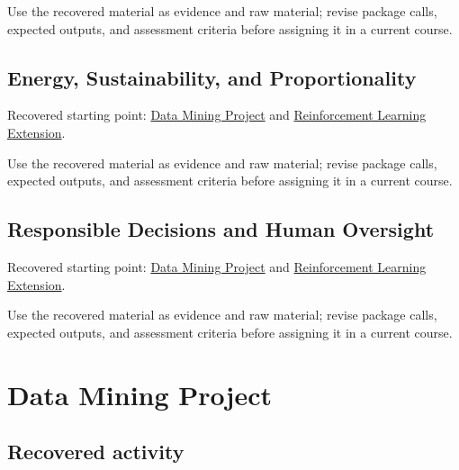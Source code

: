 \documentclass[
  letterpaper,
]{scrbook}
\begin{document}
Use the recovered material as evidence and raw material; revise package
calls, expected outputs, and assessment criteria before assigning it in
a current course.

\section*{Energy, Sustainability, and
Proportionality}\label{sec-pr-16-energy-sustainability-and-proportionality}


Recovered starting point: \hyperref[sec-lab-data-mining-project]{Data
Mining Project} and
\hyperref[sec-lab-reinforcement-learning-extension]{Reinforcement
Learning Extension}.

Use the recovered material as evidence and raw material; revise package
calls, expected outputs, and assessment criteria before assigning it in
a current course.

\section*{Responsible Decisions and Human
Oversight}\label{sec-pr-16-responsible-decisions-and-human-oversight}


Recovered starting point: \hyperref[sec-lab-data-mining-project]{Data
Mining Project} and
\hyperref[sec-lab-reinforcement-learning-extension]{Reinforcement
Learning Extension}.

Use the recovered material as evidence and raw material; revise package
calls, expected outputs, and assessment criteria before assigning it in
a current course.

\chapter*{Data Mining Project}\label{ch-lab-data-mining-project}


\section*{Recovered activity}\label{sec-lab-data-mining-project}
\end{document}

